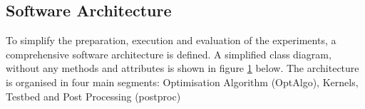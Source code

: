 \documentclass[./\jobname.tex]{subfiles}
\begin{document}
\subsection{Software Architecture}
\label{chap:software_architecutre}
To simplify the preparation, execution and evaluation of the experiments, a comprehensive software architecture is defined. A simplified class diagram, without any methods and attributes is shown in figure \ref{fig:uml_class_small} below. The architecture is organised in four main segments: Optimisation Algorithm (OptAlgo), Kernels, Testbed and Post Processing (post\textunderscore proc)

\begin{figure}[h]
	\centering
	\noindent{}
	\label{fig:uml_class_small}
\end{figure}
\end{document}
